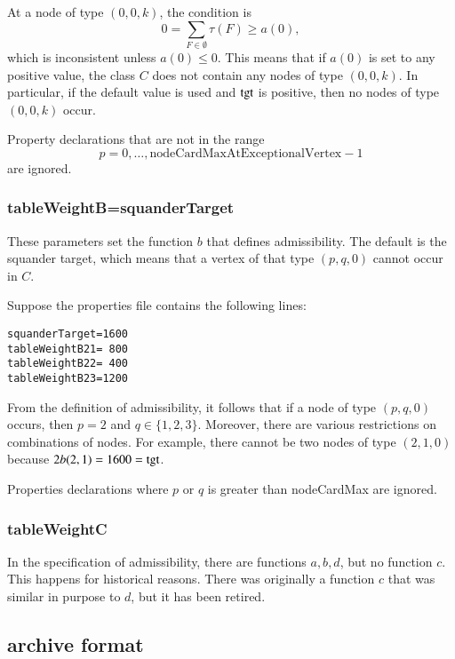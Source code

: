 \begin{example}
At a node of type $(0,0,k)$, the condition is
\[
0  =\sum_{F\in\emptyset}\tau(F) \ge a(0),
\]
which is inconsistent unless $a(0)\le 0$.  This means that if $a(0)$ is set to any
positive value, the class $C$ does not contain any nodes of type $(0,0,k)$.
In particular, if the default value is used and ${\operatorname{tgt}}$ is positive, then no nodes
of type $(0,0,k)$ occur.
\end{example}

Property declarations 
that are not in the range 
\[
p=0,\ldots,\text{nodeCardMaxAtExceptionalVertex}-1
\]
are ignored. 


\subsubsection{tableWeightB\wild\wild=squanderTarget}

These parameters set the function $b$ that defines admissibility.  The default is
the squander target, which means that a vertex of that type $(p,q,0)$ cannot occur in
$C$.

\begin{example} Suppose the properties file contains the following lines:
\begin{verbatim}
squanderTarget=1600
tableWeightB21= 800
tableWeightB22= 400
tableWeightB23=1200
\end{verbatim}
From the definition of admissibility, it follows that if a node of type $(p,q,0)$ occurs,
then $p=2$ and $q\in\{1,2,3\}$.  Moreover, there are various restrictions on 
combinations of nodes.  For example, there cannot be two nodes of type $(2,1,0)$ because
$2b(2,1)  = 1600={\operatorname{tgt}}$.
\end{example}
Properties declarations where $p$ or $q$ is greater than nodeCardMax are ignored.

\subsubsection{tableWeightC}

In the specification of admissibility, there are functions $a,b,d$,
but no function $c$.  This happens for historical reasons.  There was
originally a function $c$ that was similar in purpose to $d$, but it
has been retired.

\subsection{archive format}

